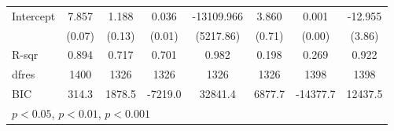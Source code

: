 \begin{landscape}
\begin{table}[H]
{\begin{tabular}{l*{7}{c}}
Intercept            &       7.857\sym{***}&       1.188\sym{***}&       0.036\sym{***}&  -13109.966\sym{*}  &       3.860\sym{***}&       0.001         &     -12.955\sym{***}\\
                    &      (0.07)         &      (0.13)         &      (0.01)         &   (5217.86)         &      (0.71)         &      (0.00)         &      (3.86)         \\
\hline
R-sqr               &       0.894         &       0.717         &       0.701         &       0.982         &       0.198         &       0.269         &       0.922         \\
dfres               &        1400         &        1326         &        1326         &        1326         &        1326         &        1398         &        1398         \\
BIC                 &       314.3         &      1878.5         &     -7219.0         &     32841.4         &      6877.7         &    -14377.7         &     12437.5         \\
\hline\hline
\multicolumn{8}{l}{\footnotesize \sym{*} \(p<0.05\), \sym{**} \(p<0.01\), \sym{***} \(p<0.001\)}\\
\end{tabular}%
}
\end{table}
\end{landscape}

